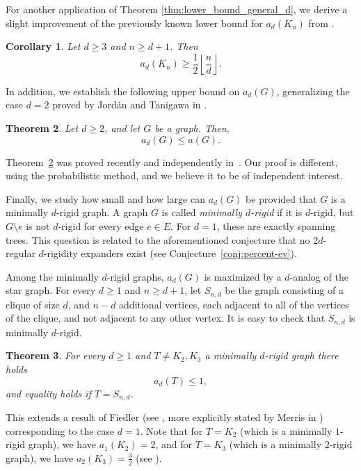 \documentclass[a4paper,11pt]{article}
\theoremstyle{plain}
\newtheorem{theorem}{\bf Theorem}[section]
\newtheorem{corollary}[theorem]{\bf Corollary}
\theoremstyle{definition}
\begin{document}
For another application of Theorem \ref{thm:lower_bound_general_d}, we derive a slight improvement of the previously known lower bound for $a_d(K_n)$ from \cite[Theorem 1.5]{lew2022d}.

\begin{corollary}\label{cor:kn_lower_bound}
Let $d\geq 3$ and $n\geq d+1$. Then
\[
    a_d(K_n)\geq \frac{1}{2}\left\lfloor\frac{n}{d}\right\rfloor.
\]
\end{corollary}


In addition, we establish the following upper bound on $a_d(G)$, generalizing the case $d=2$ proved by Jord\'an and Tanigawa in \cite[Theorem 4.2]{jordan2022rigidity}.

\begin{theorem}\label{thm:upper_bound}
Let $d\geq 2$, and let $G$ be a graph. Then,
\[
    a_d(G)\leq a(G).
\]
\end{theorem}
Theorem~\ref{thm:upper_bound} was proved recently and independently in~\cite{presenza2022upper}. Our proof is different, using the probabilistic method, and we believe it to be of independent interest.

Finally, we study how small and how large can $a_d(G)$ be provided that $G$ is a minimally $d$-rigid graph. A graph $G$ is called \emph{minimally $d$-rigid} if it is $d$-rigid, but $G\setminus e$ is not $d$-rigid for every edge $e\in E$. For $d=1$, these are exactly spanning trees. This question is related to the aforementioned conjecture that no $2d$-regular $d$-rigidity expanders exist (see Conjecture~\ref{conj:percent-ev}).

Among the minimally $d$-rigid graphs, $a_d(G)$ is maximized by a $d$-analog of the star graph. For every $d\geq 1$ and $n\geq d+1$, let $S_{n,d}$ be the graph consisting of a clique of size $d$, and $n-d$ additional vertices, each adjacent to all of the vertices of the clique, and not adjacent to any other vertex. It is easy to check that $S_{n,d}$ is minimally $d$-rigid.
\begin{theorem}\label{thm:upper_bound_minimally_rigid}
For every $d\geq 1$ and $T\neq K_2, K_3$ a minimally $d$-rigid graph there holds
\[
    a_d(T)\leq 1,
\]
and equality holds if $T=S_{n,d}$.
\end{theorem}
This extends a result of Fiedler (see \cite[4.1]{fiedler1973algebraic}, more explicitly stated by Merris in \cite[Cor. 2]{merris1987characteristic}) corresponding to the case $d=1$. Note that 
for $T=K_2$ (which is a minimally $1$-rigid graph), we have $a_1(K_2)=2$, and for $T=K_3$ (which is a minimally $2$-rigid graph), we have $a_2(K_3)=\frac{3}{2}$ (see \cite[Theorem 4.4]{jordan2022rigidity}).
\end{document}
